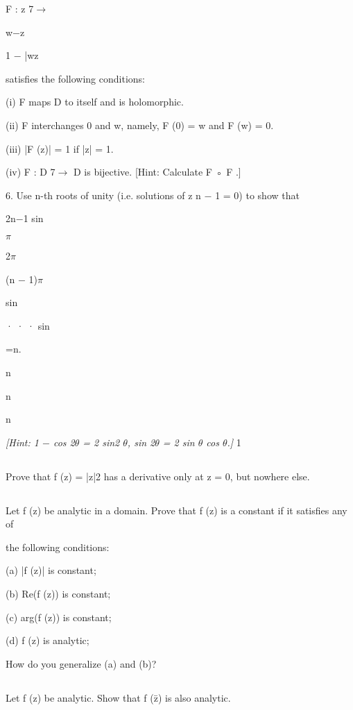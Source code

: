 F : z 7$\rightarrow$

w$-$z

1 $-$ \bar wz

satisfies the following conditions:

(i) F maps D to itself and is holomorphic.

(ii) F interchanges 0 and w, namely, F (0) = w and F (w) = 0.

(iii) |F (z)| = 1 if |z| = 1.

(iv) F : D 7$\rightarrow$ D is bijective. [Hint: Calculate F ◦ F .]

6. Use n-th roots of unity (i.e. solutions of z n $-$ 1 = 0) to show that

2n$-$1 sin

$\pi$

2$\pi$

(n $-$ 1)$\pi$

sin

· · · sin

=n.

n

n

n

\textit{
  [Hint: 1 $-$ cos 2$\theta$ = 2 sin2 $\theta$, sin 2$\theta$ = 2 sin $\theta$ cos $\theta$.]
}
1

\subsection{}
Prove that f (z) = |z|2 has a derivative only at z = 0, but nowhere else.

\subsection{}
Let f (z) be analytic in a domain. Prove that f (z) is a constant if it satisfies any of

the following conditions:

(a) |f (z)| is constant;

(b) Re(f (z)) is constant;

(c) arg(f (z)) is constant;

(d) f (z) is analytic;

How do you generalize (a) and (b)?

\subsection{}
Let f (z) be analytic. Show that f (z̄) is also analytic.

